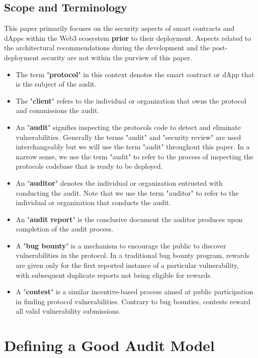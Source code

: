 \documentclass[10pt]{extarticle}
\def\tightlist{}
\begin{document}
\subsection{Scope and Terminology}\label{12-scope-and-terminology}

This paper primarily focuses on the security aspects of smart contracts
and dApps within the Web3 ecosystem \textbf{prior} to their deployment.
Aspects related to the architectural recommendations during the
development and the post-deployment security are not within the purview
of this paper.

\begin{itemize}
\tightlist
\item
  The term "\textbf{protocol}" in this context denotes the smart
  contract or dApp that is the subject of the audit.
\item
  The "\textbf{client}" refers to the individual or organization that
  owns the protocol and commissions the audit.
\item
  An "\textbf{audit}" signifies inspecting the
  protocol\textquotesingle s code to detect and eliminate
  vulnerabilities. Generally the terms "audit" and "security review" are
  used interchangeably but we will use the term "audit" throughout this
  paper. In a narrow sense, we use the term "audit" to refer to the
  process of inspecting the protocol\textquotesingle s codebase that is
  ready to be deployed.
\item
  An "\textbf{auditor}" denotes the individual or organization entrusted
  with conducting the audit. Note that we use the term "auditor" to
  refer to the individual or organization that conducts the audit.
\item
  An "\textbf{audit report}" is the conclusive document the auditor
  produces upon completion of the audit process.
\item
  A "\textbf{bug bounty}" is a mechanism to encourage the public to
  discover vulnerabilities in the protocol. In a traditional bug bounty
  program, rewards are given only for the first reported instance of a
  particular vulnerability, with subsequent duplicate reports not being
  eligible for rewards.
\item
  A "\textbf{contest}" is a similar incentive-based process aimed at
  public participation in finding protocol vulnerabilities. Contrary to
  bug bounties, contests reward all valid vulnerability submissions.
\end{itemize}

\section{Defining a Good Audit
Model}\label{2-defining-a-good-audit-model}
\end{document}
